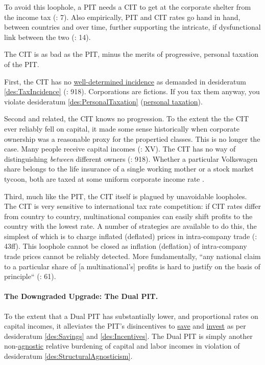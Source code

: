 To avoid this loophole, a PIT needs a CIT to get at the corporate shelter from the income tax (\citealt{Genschel2005}: 7). Also empirically, PIT and CIT rates go hand in hand, between countries and over time, further supporting the intricate, if dysfunctional link between the two (\citealt{Piatkowski2008}: 14).

The CIT is as bad as the PIT, minus the merits of progressive, personal taxation of the PIT.

First, the CIT has no \hyperref[des:TaxIncidence]{well-determined incidence} as demanded in desideratum \ref{des:TaxIncidence} (\citealt{McCaffery2005}: 918). Corporations are fictions. If you tax them anyway, you violate desideratum \ref{des:PersonalTaxation} (\hyperref[des:PersonalTaxation]{personal taxation}). 

Second and related, the CIT knows no progression. To the extent the the CIT ever reliably fell on capital, it made some sense historically when corporate ownership was a reasonable proxy for the propertied classes. This is no longer the case. Many people receive capital incomes (\citealt{Grabka2007a}: XV). The CIT has no way of distinguishing \emph{between} different owners (\citealt{McCaffery2005}: 918). Whether a particular Volkswagen share belongs to the life insurance of a single working mother or a stock market tycoon, both are taxed at some uniform corporate income rate . %

Third, much like the PIT, the CIT itself is plagued by unavoidable loopholes. The CIT is very sensitive to international tax rate competition: if CIT rates differ from country to country, multinational companies can easily shift profits to the country with the lowest rate. A number of strategies are available to do this, the simplest of which is to charge inflated (deflated) prices in intra-company trade (\citealt{Ganghof2004}: 43ff). 
This loophole cannot be closed as inflation (deflation) of intra-company trade prices cannot be reliably detected. More fundamentally, ``any national claim to a particular share of [a multinational's] profits is hard to justify on the basis of principle`` (\citealt{Genschel2005}: 61). %

\paragraph{The Downgraded Upgrade: The Dual PIT.}  \label{sec:ScoreDualPIT} To the extent that a Dual PIT has substantially lower, and proportional rates on capital incomes, it alleviates the PIT's disincentives to \hyperref[des:Savings]{save} and \hyperref[des:Incentives]{invest} as per desideratum \ref{des:Savings} and \ref{des:Incentives}. The Dual PIT is simply another non-\hyperref[des:StructuralAgnosticism]{agnostic} relative burdening of capital and labor incomes in violation of desideratum \ref{des:StructuralAgnosticism}. 


